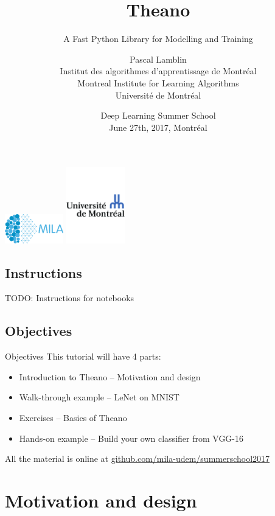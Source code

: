 \documentclass[a4paper,9pt]{beamer}
\title[Theano]{Theano}
\subtitle{A Fast Python Library for Modelling and Training}
\author[MILA]{%
Pascal Lamblin\\
Institut des algorithmes d'apprentissage de Montréal\\
Montreal Institute for Learning Algorithms\\
Université de Montréal}
\date{%
Deep Learning Summer School\\
June 27th, 2017, Montréal%
}
\begin{document}
\begin{frame}[plain]
  \titlepage
  \includegraphics[width=1in]{MILA_official_2016.png}
  \hfill
  \includegraphics[width=1in]{UdeM_logo.pdf}
\end{frame}


\subsection*{Instructions}

\begin{frame}[fragile]{TODO: Instructions for notebooks}
\end{frame}

\subsection*{Objectives}
\begin{frame}[fragile]{Objectives}
  This tutorial will have 4 parts:
  \begin{itemize}
    \item Introduction to Theano -- Motivation and design
    \item Walk-through example -- LeNet on MNIST
    \item Exercises -- Basics of Theano
    \item Hands-on example -- Build your own classifier from VGG-16
  \end{itemize}

  All the material is online at \url{github.com/mila-udem/summerschool2017}

\end{frame}


\section{Motivation and design}
\begin{frame}
  \tableofcontents[currentsection]
\end{frame}
\end{document}
